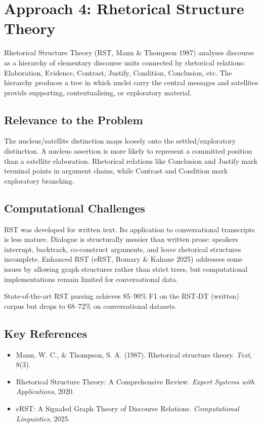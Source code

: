 \documentclass[11pt,letterpaper]{article}
\begin{document}
\section{Approach 4: Rhetorical Structure Theory}

Rhetorical Structure Theory (RST, Mann \& Thompson 1987) analyses discourse as a hierarchy of elementary discourse units connected by rhetorical relations: Elaboration, Evidence, Contrast, Justify, Condition, Conclusion, etc. The hierarchy produces a tree in which nuclei carry the central messages and satellites provide supporting, contextualising, or exploratory material.

\subsection{Relevance to the Problem}

The nucleus/satellite distinction maps loosely onto the settled/exploratory distinction. A nucleus assertion is more likely to represent a committed position than a satellite elaboration. Rhetorical relations like Conclusion and Justify mark terminal points in argument chains, while Contrast and Condition mark exploratory branching.

\subsection{Computational Challenges}

RST was developed for written text. Its application to conversational transcripts is less mature. Dialogue is structurally messier than written prose: speakers interrupt, backtrack, co-construct arguments, and leave rhetorical structures incomplete. Enhanced RST (eRST, Romary \& Kahane 2025) addresses some issues by allowing graph structures rather than strict trees, but computational implementations remain limited for conversational data.

State-of-the-art RST parsing achieves 85–90\% F1 on the RST-DT (written) corpus but drops to 68–72\% on conversational datasets.

\subsection{Key References}

\begin{itemize}
  \item Mann, W. C., \& Thompson, S. A. (1987). Rhetorical structure theory. \textit{Text}, 8(3).
  \item Rhetorical Structure Theory: A Comprehensive Review. \textit{Expert Systems with Applications}, 2020.
  \item eRST: A Signaled Graph Theory of Discourse Relations. \textit{Computational Linguistics}, 2025.
\end{itemize}
\end{document}
